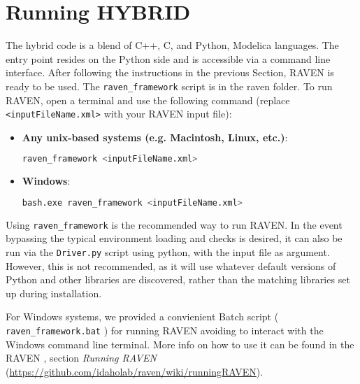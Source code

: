 \section{Running HYBRID}
\label{HowToRun}

The hybrid code is a blend of C++, C, and Python, Modelica languages. The entry point
resides on the Python side and is accessible via a command line interface.
%
After following the instructions in the previous Section, RAVEN is ready to be
used.
%
The \texttt{raven\_framework} script is in the raven folder.
%
To run RAVEN, open a terminal and use the following command (replace \texttt{<inputFileName.xml>} with your RAVEN input file):

\begin{itemize}

  \item \textbf{Any unix-based systems (e.g. Macintosh, Linux, etc.)}:
\begin{lstlisting}[language=bash]
raven_framework <inputFileName.xml>
\end{lstlisting}
  \item \textbf{Windows}:
  \begin{lstlisting}[language=bash]
bash.exe raven_framework <inputFileName.xml>
\end{lstlisting}
  
\end{itemize}

Using \texttt{raven\_framework} is the recommended way to run RAVEN.  In the event bypassing the typical
environment loading and checks is desired, it can also be run via
the \texttt{Driver.py} script using python, with the input file as argument.  However, this is not
recommended, as it will use whatever default versions of Python and other libraries are discovered, rather
than the matching libraries set up during installation.

\nb For Windows systems, we provided a convienient Batch script ( \texttt{raven\_framework.bat} ) for running RAVEN 
avoiding to interact with the Windows command line terminal. More info on how to use it can be found in the RAVEN
\wiki , section \textit{Running RAVEN} (\url{https://github.com/idaholab/raven/wiki/runningRAVEN}).

